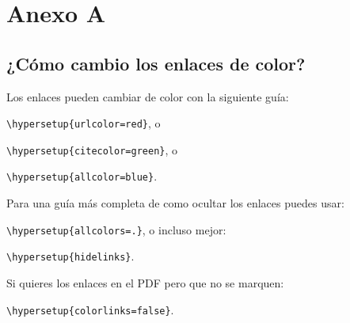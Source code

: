 
\chapter{Anexo A} %

\label{AppendixA} %

\section{¿Cómo cambio los enlaces de color?}

Los enlaces pueden cambiar de color con la siguiente guía:

{\small\verb!\hypersetup{urlcolor=red}!}, o

{\small\verb!\hypersetup{citecolor=green}!}, o

{\small\verb!\hypersetup{allcolor=blue}!}.

\noindent Para una guía más completa de como ocultar los enlaces puedes usar:

{\small\verb!\hypersetup{allcolors=.}!}, o incluso mejor: 

{\small\verb!\hypersetup{hidelinks}!}.

\noindent Si quieres los enlaces en el PDF pero que no se marquen:

{\small\verb!\hypersetup{colorlinks=false}!}.
